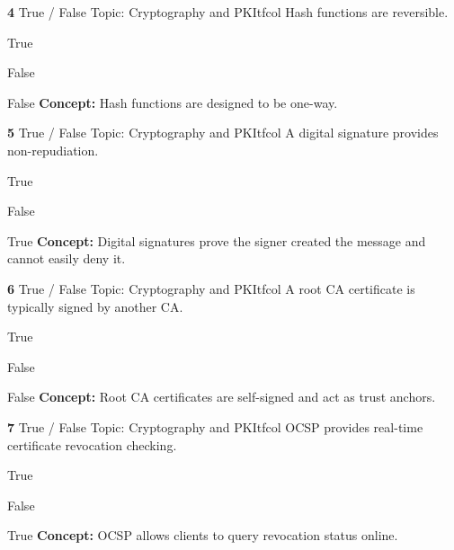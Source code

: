 \documentclass[10pt,a4paper]{article}
\begin{document}
\begin{qcard}{\color{white}\textbf{4} \hfill \small True / False \textbar{} Topic: Cryptography and PKI}{tfcol}
Hash functions are reversible.

\begin{qoptions}
\item True
\item False
\end{qoptions}
\begin{explainbox}{False}
\textbf{Concept:} Hash functions are designed to be one-way.
\end{explainbox}
\end{qcard}

\begin{qcard}{\color{white}\textbf{5} \hfill \small True / False \textbar{} Topic: Cryptography and PKI}{tfcol}
A digital signature provides non-repudiation.

\begin{qoptions}
\item True
\item False
\end{qoptions}
\begin{explainbox}{True}
\textbf{Concept:} Digital signatures prove the signer created the message and cannot easily deny it.
\end{explainbox}
\end{qcard}

\begin{qcard}{\color{white}\textbf{6} \hfill \small True / False \textbar{} Topic: Cryptography and PKI}{tfcol}
A root CA certificate is typically signed by another CA.

\begin{qoptions}
\item True
\item False
\end{qoptions}
\begin{explainbox}{False}
\textbf{Concept:} Root CA certificates are self-signed and act as trust anchors.
\end{explainbox}
\end{qcard}

\begin{qcard}{\color{white}\textbf{7} \hfill \small True / False \textbar{} Topic: Cryptography and PKI}{tfcol}
OCSP provides real-time certificate revocation checking.

\begin{qoptions}
\item True
\item False
\end{qoptions}
\begin{explainbox}{True}
\textbf{Concept:} OCSP allows clients to query revocation status online.
\end{explainbox}
\end{qcard}
\end{document}
